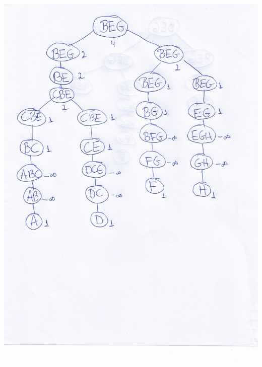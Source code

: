 \documentclass{article}
\begin{document}
\includegraphics[scale=0.7]{3rd_demo_graph_hw3}
\end{document}
